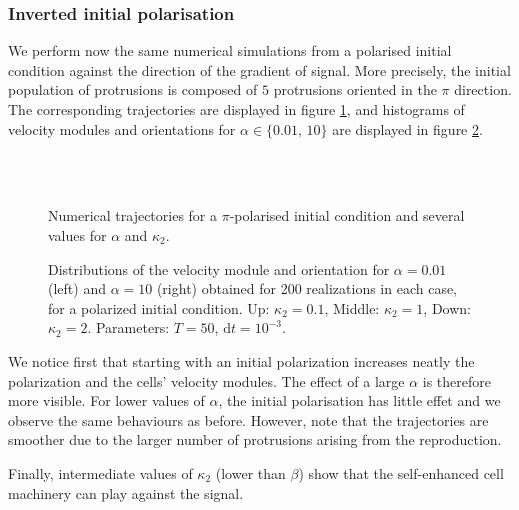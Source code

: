 \documentclass[a4paper,11pt]{article}
\newcommand{\dx}{\textrm{d}}
\begin{document}
\subsubsection{Inverted initial polarisation}
We perform now the same numerical simulations from a polarised initial condition against the direction of the gradient of signal. More precisely, the initial population of protrusions is composed of $5$ protrusions oriented in the $\pi$ direction. The corresponding trajectories are displayed in figure \ref{fig:CI}, and histograms of velocity modules and orientations for $\alpha\in \{ 0.01,\,10\}$ are displayed in figure \ref{fig:CI_distrib}.

\begin{figure}[H]
	\centering
	\quad
	\\	
		\quad
	\\	
	\caption{Numerical trajectories for a $\pi$-polarised initial condition and several values for $\alpha$ and $\kappa_2$.}\label{fig:CI}
\end{figure}

\begin{figure}[H]
\centering
{}\qquad
{}
\caption{Distributions of the velocity module and orientation for $\alpha=0.01$ (left) and $\alpha=10$ (right) obtained for 200 realizations in each case, for a polarized initial condition. Up: $\kappa_2=0.1$, Middle: $\kappa_2=1$, Down: $\kappa_2=2$. Parameters: $T=50$, $\dx t = 10^{-3}$.}\label{fig:CI_distrib}
\end{figure}
	
	
We notice first that starting with an initial polarization increases neatly the polarization and the cells' velocity modules. The effect of a large $\alpha$ is therefore more visible. For lower values of $\alpha$, the initial polarisation has little effet and we observe the same behaviours as before. However, note that the trajectories are smoother due to the larger number of protrusions arising from the reproduction. \par 
Finally, intermediate values of $\kappa_2$ (lower than $\beta$) show that the self-enhanced cell machinery can play against the signal. 	
	
\end{document}
